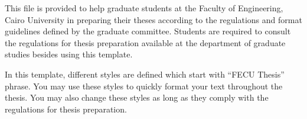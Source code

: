 This file is provided to help graduate students at the Faculty of Engineering, Cairo University in preparing their theses according to the regulations and format guidelines defined by the graduate committee. Students are required to consult the regulations for thesis preparation available at the department of graduate studies besides using this template. 

In this template, different styles are defined which start with “FECU Thesis” phrase. You may use these styles to quickly format your text throughout the thesis. You may also change these styles as long as they comply with the regulations for thesis preparation.

